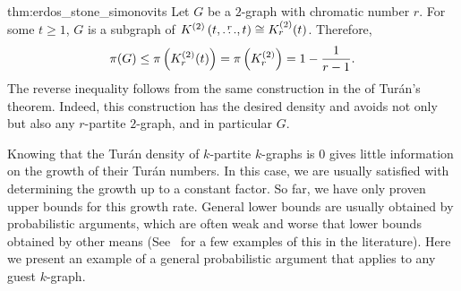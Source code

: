 \begin{delayedproof}{thm:erdos_stone_simonovits}
    Let $G$ be a $2$-graph with chromatic number $r$.
    For some $t \geq 1$, $G$ is a subgraph of
    $K^{(2)}\left(t, \overset{r}{\dots}, t\right) \cong K^{(2)}_{r}(t)$.
    Therefore,
    \[
        \pi(G) \leq \pi\left(K^{(2)}_{r}(t)\right)
        = \pi\left(K^{(2)}_{r}\right) = 1 - \frac{1}{r-1}.
    \]
    The reverse inequality follows from the same construction in the  of Turán's theorem.
    Indeed, this construction has the desired density and avoids not only  but also
    any $r$-partite $2$-graph, and in particular $G$.
\end{delayedproof}


Knowing that the Turán density of $k$-partite $k$-graphs is $0$
gives little information on the growth of their Turán numbers.
In this case, we are usually satisfied with determining the growth up to a constant factor.
So far, we have only proven upper bounds for this growth rate.
General lower bounds are usually obtained by probabilistic arguments,
which are often weak and worse that lower bounds obtained by other means (See~
for a few examples of this in the literature).
Here we present an example of a general probabilistic argument that applies to any guest $k$-graph.

